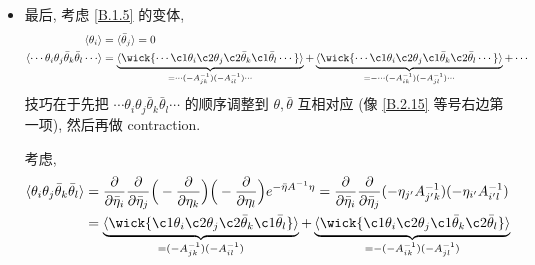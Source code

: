 \begin{itemize}
	\item 最后, 考虑 \eqref{B.1.5} 的变体,
	\begin{align}
		\braket{\theta_i} &= \braket{\bar{\theta}_j} = 0 \\
		\braket{\cdots \theta_i \theta_j \bar{\theta}_k \bar{\theta}_l \cdots} &= \underbrace{\braket{\wick{
			\cdots \c1 \theta_i \c2 \theta_j \c2 {\bar{\theta}}_k \c1 {\bar{\theta}}_l \cdots
		}}}_{= \cdots (- A^{- 1}_{j k}) (- A^{- 1}_{i l}) \cdots} + \underbrace{\braket{\wick{
			\cdots \c1 \theta_i \c2 \theta_j \c1 {\bar{\theta}}_k \c2 {\bar{\theta}}_l \cdots
		}}}_{= - \cdots (- A^{- 1}_{i k}) (- A^{- 1}_{j l}) \cdots} + \cdots \label{B.2.15}
	\end{align}
	技巧在于先把 $\cdots \theta_i \theta_j \bar{\theta}_k \bar{\theta}_l \cdots$ 的顺序调整到 $\theta, \bar{\theta}$ 互相对应 (像 \eqref{B.2.15} 等号右边第一项), 然后再做 contraction.
	
	\begin{tcolorbox}[title=calculation:]
		考虑,
		\begin{align}
			\braket{\theta_i \theta_j \bar{\theta}_k \bar{\theta}_l} &= \frac{\partial}{\partial \bar{\eta}_i} \frac{\partial}{\partial \bar{\eta}_j} \Big( - \frac{\partial}{\partial \eta_k} \Big) \Big( - \frac{\partial}{\partial \eta_l} \Big) e^{- \bar{\eta} A^{- 1} \eta} = \frac{\partial}{\partial \bar{\eta}_i} \frac{\partial}{\partial \bar{\eta}_j} (- \eta_{j'} A^{- 1}_{j' k}) (- \eta_{i'} A^{- 1}_{i' l}) \notag \\
			&= \underbrace{\braket{\wick{
						\c1 \theta_i \c2 \theta_j \c2 {\bar{\theta}}_k \c1 {\bar{\theta}}_l
			}}}_{= (- A^{- 1}_{j k}) (- A^{- 1}_{i l})} + \underbrace{\braket{\wick{
						\c1 \theta_i \c2 \theta_j \c1 {\bar{\theta}}_k \c2 {\bar{\theta}}_l
			}}}_{= - (- A^{- 1}_{i k}) (- A^{- 1}_{j l})}
		\end{align}
	\end{tcolorbox}
\end{itemize}
